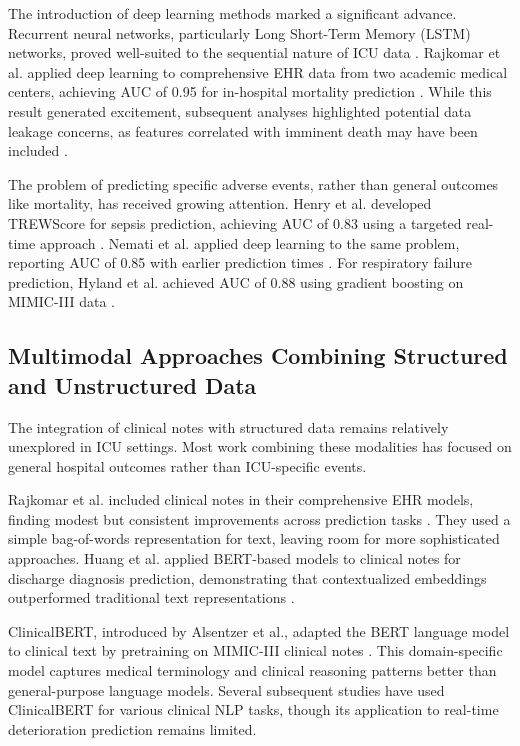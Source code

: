 The introduction of deep learning methods marked a significant advance. Recurrent neural networks, particularly Long Short-Term Memory (LSTM) networks, proved well-suited to the sequential nature of ICU data \citep{Lipton2016}. Rajkomar et al. applied deep learning to comprehensive EHR data from two academic medical centers, achieving AUC of 0.95 for in-hospital mortality prediction \citep{Rajkomar2018}. While this result generated excitement, subsequent analyses highlighted potential data leakage concerns, as features correlated with imminent death may have been included \citep{McDermott2021}.

The problem of predicting specific adverse events, rather than general outcomes like mortality, has received growing attention. Henry et al. developed TREWScore for sepsis prediction, achieving AUC of 0.83 using a targeted real-time approach \citep{Henry2015}. Nemati et al. applied deep learning to the same problem, reporting AUC of 0.85 with earlier prediction times \citep{Nemati2018}. For respiratory failure prediction, Hyland et al. achieved AUC of 0.88 using gradient boosting on MIMIC-III data \citep{Hyland2020}.

\subsection{Multimodal Approaches Combining Structured and Unstructured Data}

The integration of clinical notes with structured data remains relatively unexplored in ICU settings. Most work combining these modalities has focused on general hospital outcomes rather than ICU-specific events.

Rajkomar et al. included clinical notes in their comprehensive EHR models, finding modest but consistent improvements across prediction tasks \citep{Rajkomar2018}. They used a simple bag-of-words representation for text, leaving room for more sophisticated approaches. Huang et al. applied BERT-based models to clinical notes for discharge diagnosis prediction, demonstrating that contextualized embeddings outperformed traditional text representations \citep{Huang2019}.

ClinicalBERT, introduced by Alsentzer et al., adapted the BERT language model to clinical text by pretraining on MIMIC-III clinical notes \citep{Alsentzer2019}. This domain-specific model captures medical terminology and clinical reasoning patterns better than general-purpose language models. Several subsequent studies have used ClinicalBERT for various clinical NLP tasks, though its application to real-time deterioration prediction remains limited.


